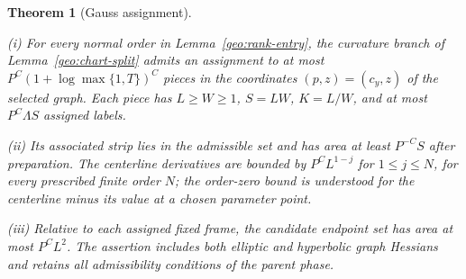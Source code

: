\documentclass[11pt]{amsart}
\newtheorem{theorem}{Theorem}[section]
\theoremstyle{definition}
\theoremstyle{remark}
\numberwithin{equation}{section}
\begin{document}
\begin{theorem}[Gauss assignment]\label{geo:gauss}

\leavevmode\noindent\textup{(i)} For every normal order in Lemma~\ref{geo:rank-entry}, the curvature branch of Lemma~\ref{geo:chart-split} admits an assignment to at most $P^C(1+\log\max\{1,T\})^C$ pieces in the coordinates $(p,z)=(c_y,z)$ of the selected graph. Each piece has $L\ge W\ge1$, $S=LW$, $K=L/W$, and at most $P^C\Lambda S$ assigned labels.

\noindent\textup{(ii)} Its associated strip lies in the admissible set and has area at least $P^{-C}S$ after preparation. The centerline derivatives are bounded by $P^CL^{1-j}$ for $1\le j\le N$, for every prescribed finite order $N$; the order-zero bound is understood for the centerline minus its value at a chosen parameter point.

\noindent\textup{(iii)} Relative to each assigned fixed frame, the candidate endpoint set has area at most $P^CL^2$. The assertion includes both elliptic and hyperbolic graph Hessians and retains all admissibility conditions of the parent phase.
\end{theorem}
\end{document}
